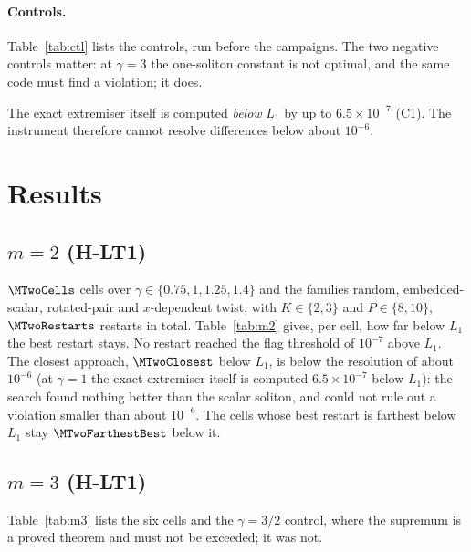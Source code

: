 \documentclass[11pt]{article}
\theoremstyle{remark}
\newcommand{\Lone}{L_1}
\begin{document}
\paragraph{Controls.} Table~\ref{tab:ctl} lists the controls, run before the campaigns. The two negative controls matter: at $\gamma=3$ the one-soliton constant is not optimal, and the same code must find a violation; it does.
\begin{table}[h]\centering\small

\caption{Controls (from \texttt{results/openai\_math/hypotheses/lt\_matrix/controls.json}). Excess means computed ratio over $\Lone$ minus one.}\label{tab:ctl}
\end{table}
The exact extremiser itself is computed \emph{below} $\Lone$ by up to $6.5\times10^{-7}$ (C1). The instrument therefore cannot resolve differences below about $10^{-6}$.

\section{Results}
\subsection{$m=2$ (H-LT1)}
$\MTwoCells$ cells over $\gamma\in\{0.75,1,1.25,1.4\}$ and the families random, embedded-scalar, rotated-pair and $x$-dependent twist, with $K\in\{2,3\}$ and $P\in\{8,10\}$,
$\MTwoRestarts$ restarts in total. Table~\ref{tab:m2} gives, per cell, how far below $\Lone$ the best restart stays. No restart reached the flag threshold of $10^{-7}$ above $\Lone$.
The closest approach, $\MTwoClosest$ below $\Lone$, is below the resolution of about $10^{-6}$ (at $\gamma=1$ the exact extremiser itself is computed $6.5\times10^{-7}$ below $\Lone$): the search found nothing better than the scalar soliton,
and could not rule out a violation smaller than about $10^{-6}$. The cells whose best restart is farthest below $\Lone$ stay $\MTwoFarthestBest$ below it.
\begin{table}[h]\centering\small

\caption{All $m=2$ cells (from \texttt{LT\_A/result.json}). Restarts per cell are unequal (12, 24 or 36). The ``twist'' cells received extra restart chunks; the preregistered saturation criterion was not met for $\gamma=0.75$ and $1$.}\label{tab:m2}
\end{table}

\subsection{$m=3$ (H-LT1)}
Table~\ref{tab:m3} lists the six cells and the $\gamma=3/2$ control, where the supremum is a proved theorem and must not be exceeded; it was not.
\begin{table}[h]\centering\small

\caption{$m=3$ cells (from \texttt{LT\_B/result.json}).}\label{tab:m3}
\end{table}
\end{document}
